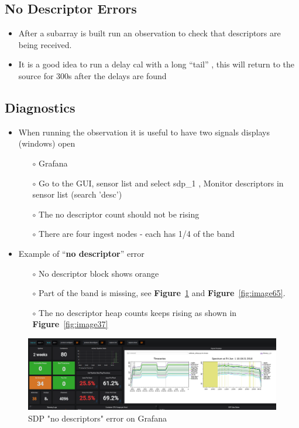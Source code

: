 \subsection{ No Descriptor Errors} 
\begin{itemize}
\item{} After a subarray is built run an observation to check that descriptors are being received.
\item{} It is a good idea to run a delay cal with a long “tail” , this will return to the source for 300s after the delays are found
\end{itemize}
\subsection{ Diagnostics}
\begin{itemize}
	\item{} When running the observation it is useful to have two signals displays (windows) open
	\begin{itemize}
		\item[$\circ$] Grafana
		  \item[$\circ$]    Go to the GUI, sensor list and select sdp\_1 , Monitor descriptors in sensor list (search 'desc')
		  \item[$\circ$] The no descriptor count should not be rising
		    
		  \item[$\circ$] There are four ingest nodes - each has 1/4 of the band   
		
	\end{itemize}
	


\item{} Example of “\textbf{no descriptor}” error
	\begin{itemize}
	\item[$\circ$] No descriptor block shows orange
\item[$\circ$] Part of the band is missing, see \textbf{Figure}~\ref{fig:image79} and \textbf{Figure}~\ref{fig:image65}.
\item[$\circ$] The no descriptor heap counts keeps rising as shown in \textbf{Figure}~\ref{fig:image37}
\end{itemize}
\end{itemize}



\begin{figure}[!thb]
	\centering
	\includegraphics[scale=0.2]{Chapters/images/image79.png}
	
	\caption{SDP "no descriptors" error on Grafana}
	\label{fig:image79}
\end{figure}

